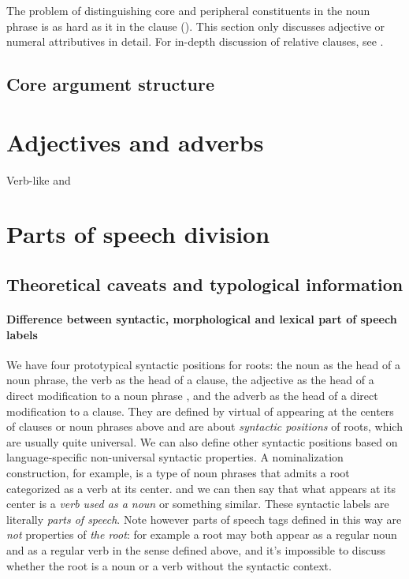 \documentclass[a4paper, oneside, 12pt]{report}
\newcommand*{\citepage}[1]{p.~{#1}}
\newcommand*{\term}[1]{\emph{#1}}
\begin{document}
The problem of distinguishing core and peripheral constituents
in the noun phrase is as hard as it in the clause 
().
This section only discusses adjective or numeral attributives in detail.
For in-depth discussion of relative clauses, see .


\subsection{Core argument structure}\label{sec:grammatical.np.core}



\section{Adjectives and adverbs}\label{sec:grammatical.modify}

Verb-like and 

\section{Parts of speech division}\label{sec:grammatical.pos}

\subsection{Theoretical caveats and typological information}\label{sec:grammatical.pos.caveat}

\paragraph*{Difference between syntactic, morphological and lexical part of speech labels}
We have four prototypical syntactic positions for roots:
the noun as the head of a noun phrase,
the verb as the head of a clause,
the adjective as the head of a direct modification to a noun phrase
\citep[\citepage{23}]{cinque2010syntax},
and the adverb as the head of a direct modification to a clause.
They are defined by virtual
of appearing at the centers of clauses or noun phrases above
and are about \emph{syntactic positions} of roots,
which are usually quite universal.
We can also define other syntactic positions based on language-specific non-universal syntactic properties.
A nominalization construction, for example, is a type of noun phrases that
admits a root categorized as a verb at its center.
and we can then say that what appears at its center is a \term{verb used as a noun} or something similar.
These syntactic labels are literally \term{parts of speech}.
Note however parts of speech tags defined in this way are \emph{not} properties of \emph{the root}:
for example a root may both appear as a regular noun and as a regular verb in the sense defined above,
and it's impossible to discuss whether the root is a noun or a verb without the syntactic context.
\end{document}
